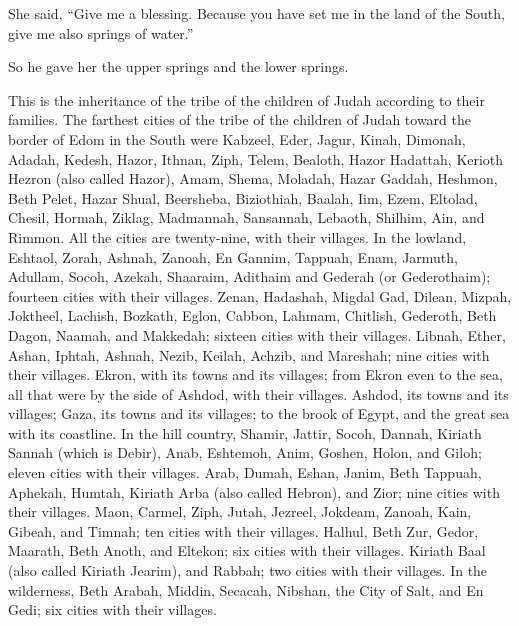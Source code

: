  She said, ``Give me a blessing. Because you have set me
in the land of the South, give me also springs of water.''

So he gave her the upper springs and the lower springs.

 This is the inheritance of the tribe of the children of
Judah according to their families.  The farthest cities
of the tribe of the children of Judah toward the border of Edom in the
South were Kabzeel, Eder, Jagur,  Kinah, Dimonah, Adadah,
 Kedesh, Hazor, Ithnan,  Ziph, Telem,
Bealoth,  Hazor Hadattah, Kerioth Hezron (also called
Hazor),  Amam, Shema, Moladah,  Hazar
Gaddah, Heshmon, Beth Pelet,  Hazar Shual, Beersheba,
Biziothiah,  Baalah, Iim, Ezem,  Eltolad,
Chesil, Hormah,  Ziklag, Madmannah, Sansannah,
 Lebaoth, Shilhim, Ain, and Rimmon. All the cities are
twenty-nine, with their villages.  In the lowland,
Eshtaol, Zorah, Ashnah,  Zanoah, En Gannim, Tappuah,
Enam,  Jarmuth, Adullam, Socoh, Azekah, 
Shaaraim, Adithaim and Gederah (or Gederothaim); fourteen cities with
their villages.  Zenan, Hadashah, Migdal Gad,
 Dilean, Mizpah, Joktheel,  Lachish,
Bozkath, Eglon,  Cabbon, Lahmam, Chitlish,
 Gederoth, Beth Dagon, Naamah, and Makkedah; sixteen
cities with their villages.  Libnah, Ether, Ashan,
 Iphtah, Ashnah, Nezib,  Keilah, Achzib,
and Mareshah; nine cities with their villages.  Ekron,
with its towns and its villages;  from Ekron even to the
sea, all that were by the side of Ashdod, with their villages.
 Ashdod, its towns and its villages; Gaza, its towns and
its villages; to the brook of Egypt, and the great sea with its
coastline.  In the hill country, Shamir, Jattir, Socoh,
 Dannah, Kiriath Sannah (which is Debir), 
Anab, Eshtemoh, Anim,  Goshen, Holon, and Giloh; eleven
cities with their villages.  Arab, Dumah, Eshan,
 Janim, Beth Tappuah, Aphekah,  Humtah,
Kiriath Arba (also called Hebron), and Zior; nine cities with their
villages.  Maon, Carmel, Ziph, Jutah, 
Jezreel, Jokdeam, Zanoah,  Kain, Gibeah, and Timnah; ten
cities with their villages.  Halhul, Beth Zur, Gedor,
 Maarath, Beth Anoth, and Eltekon; six cities with their
villages.  Kiriath Baal (also called Kiriath Jearim), and
Rabbah; two cities with their villages.  In the
wilderness, Beth Arabah, Middin, Secacah,  Nibshan, the
City of Salt, and En Gedi; six cities with their villages.

